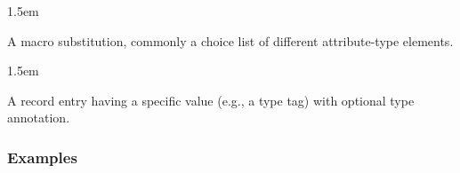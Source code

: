\documentclass{article}
\begin{document}
\begin{mddefinitions}
\begin{mdbmarginx}{}{}{}{1.5em}%
\begin{mddefdata}%

A macro substitution, commonly a choice list of different attribute-type elements.%
\end{mddefdata}%
\end{mdbmarginx}%


\begin{mdbmarginx}{}{}{}{1.5em}%
\begin{mddefdata}%

A record entry having a specific value (e.g., a type tag) with optional type annotation.%
\end{mddefdata}%
\end{mdbmarginx}%
\end{mddefinitions}%

\subsubsection{Examples}\label{sec3-examples}%
\end{document}
